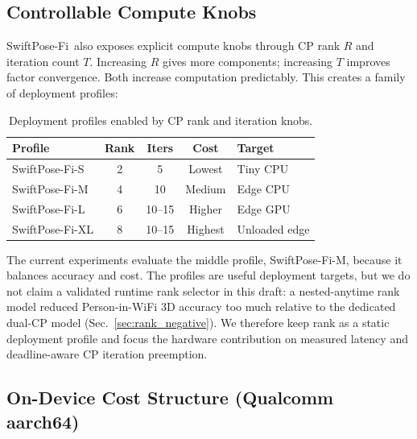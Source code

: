 \documentclass[10pt,conference]{IEEEtran}
\newcommand{\method}{SwiftPose-Fi}
\begin{document}
\subsection{Controllable Compute Knobs}

\method\ also exposes explicit compute knobs through CP rank $R$ and iteration count $T$. Increasing $R$ gives more components; increasing $T$ improves factor convergence. Both increase computation predictably. This creates a family of deployment profiles:

\begin{table}[t]
\centering
\caption{Deployment profiles enabled by CP rank and iteration knobs.}
\label{tab:profiles}
\begin{tabular}{lcccl}
\toprule
Profile & Rank & Iters & Cost & Target \\
\midrule
SwiftPose-Fi-S & 2 & 5 & Lowest & Tiny CPU \\
SwiftPose-Fi-M & 4 & 10 & Medium & Edge CPU \\
SwiftPose-Fi-L & 6 & 10--15 & Higher & Edge GPU \\
SwiftPose-Fi-XL & 8 & 10--15 & Highest & Unloaded edge \\
\bottomrule
\end{tabular}
\end{table}

The current experiments evaluate the middle profile, SwiftPose-Fi-M, because it balances accuracy and cost. The profiles are useful deployment targets, but we do not claim a validated runtime rank selector in this draft: a nested-anytime rank model reduced Person-in-WiFi 3D accuracy too much relative to the dedicated dual-CP model (Sec.~\ref{sec:rank_negative}). We therefore keep rank as a static deployment profile and focus the hardware contribution on measured latency and deadline-aware CP iteration preemption.

\subsection{On-Device Cost Structure (Qualcomm aarch64)}
\label{sec:ondevice}
\end{document}
